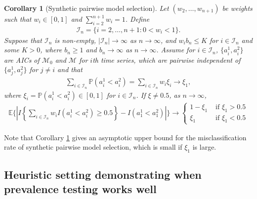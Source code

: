 \documentclass[11pt]{article}
\def\mbf#1{\mathbf{#1}} %
\def\mc#1{\mathcal{#1}} %
\def\E{\mathbb{E}} %
\def\mc#1{\mathcal{#1}}
\def\P{\mathbb{P}}
\newtheorem{corollary}{Corollary}
\theoremstyle{definition}
\begin{document}
\begin{corollary}[Synthetic pairwise model selection]
\label{coro2}Let $(w_2, \ldots, w_{n+1})$ be weights such that $w_i \in [0,1]$ and $\sum_{i=2}^{n+1} w_i=1$. Define
\begin{align*}
  \mc{I}_n = \{i =  2,\ldots, n+1\colon 0< w_i < 1\}.
\end{align*}
Suppose that  $\mc{I}_n$  is non-empty, $|\mc{I}_n| \to \infty$ as $n \to \infty$, and $w_i b_n\leq K$ for $i\in \mc{I}_n$ and some $K>0$, where $b_n \geq 1$ and $b_n \to \infty$ as $n\to \infty$. Assume for $i \in \mc{I}_n$,  $\{a_i^1, a_i^2\}$ are AICs of $\mc{M}_0$ and  $\mc{M}$ for $i$th time series, which are pairwise independent of $\{a_j^1, a_j^2\}$ for $j \neq i$ and that
\begin{align*}
  \sum_{i\in \mc{I}_n}\P(a_i^1 < a_i^2) = \sum_{i\in \mc{I}_n} w_i \xi_i \to \xi_{1},
\end{align*}
where $\xi_i =  \P(a_i^1 < a_i^2)\in [0,1]$ for $i \in \mc{I}_n$. If $\xi  \neq 0.5$, as $n\to \infty$, 
\begin{align*}
  \E \bigg\{\left|I\left\{ \sum_{i\in \mc{I}_n} w_i I(a_i^1 < a_i^2) \geq 0.5\right\}
  - I( a_1^1 < a_1^2) \right|\bigg\}
  \to  \begin{cases}
    1- \xi_1 & \text{ if } \xi_1 > 0.5 \\
   \xi_1 & \text{ if } \xi_1 < 0.5 
  \end{cases}
\end{align*}
\end{corollary}

Note that Corollary \ref{coro2} gives an asymptotic upper bound for the misclassification rate of synthetic pairwise model selection, which is small if $\xi_1$ is large.






\subsection{Heuristic setting demonstrating when prevalence testing works well}
\label{mathdemo}
\end{document}
